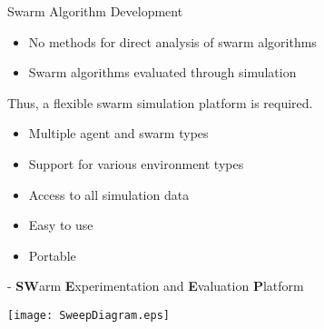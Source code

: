 \begin{slide}{Swarm Algorithm Development}
  \begin{itemize}
  \item No methods for direct analysis of swarm algorithms
  \item Swarm algorithms evaluated through simulation
  \end{itemize}
  
  \vspace{2ex}

  Thus, a flexible swarm simulation platform is required.
  \begin{itemize}
  \item Multiple agent and swarm types
  \item Support for various environment types
  \item Access to all simulation data
  \item Easy to use
  \item Portable
  \end{itemize}
\end{slide}


\begin{slide}{\SWEEP}
  \SWEEP - \textbf{SW}arm \textbf{E}xperimentation and
  \textbf{E}valuation \textbf{P}latform
  
  \begin{minipage}{\textwidth}
    \centering
    \vspace{.5cm}
    \texttt{[image: SweepDiagram.eps]}
  \end{minipage}
\end{slide}


